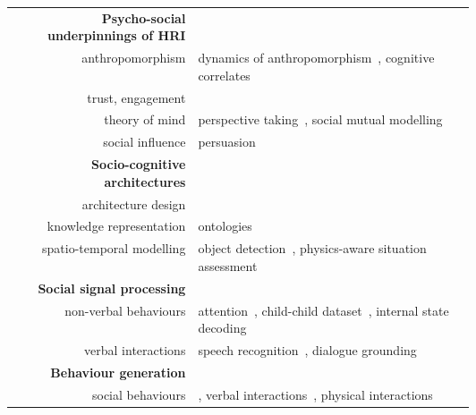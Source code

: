 \begin{table}[h]
    \centering
    \begin{tabular}{rp{0.6\linewidth}}
        \toprule
        \textbf{Psycho-social underpinnings of HRI} \\  
        anthropomorphism & \small dynamics of
        anthropomorphism~\cite{lemaignan2014dynamics}, cognitive correlates~\cite{lemaignan2014cognitive} \\
        trust, engagement & \small \cite{flook2019impact,lemaignan2015youre,fink2014which} \\
        theory of mind & \small perspective taking~\cite{ros2010which, warnier2012when}, social mutual modelling~\cite{lemaignan2015mutual,dillenbourg2016symmetry} \\
        social influence & \small persuasion~\cite{winkle2019effective} \\
        \midrule
        \textbf{Socio-cognitive architectures} \\
        architecture design & \small \cite{lemaignan2017artificial, baxter2016cognitive,lemaignan2014challenges,lallee2012towards, mallet2010genom3} \\
        knowledge representation & \small
        ontologies~\cite{lemaignan2010oro, lemaignan2013explicit} \\    
        spatio-temporal modelling & \small object
        detection~\cite{wallbridge2017qualitative}, \newline physics-aware situation
        assessment~\cite{lemaignan2018underworlds,sallami2019simulation} \\
        \midrule
        \textbf{Social signal processing}\\
        non-verbal behaviours & \small attention~\cite{lemaignan2016realtime},
        child-child dataset~\cite{lemaignan2018pinsoro}, internal state decoding~\cite{bartlett2019what} \\
        verbal interactions & \small speech recognition~\cite{kennedy2017child}, dialogue grounding~\cite{lemaignan2011grounding} \\
        \midrule
        \textbf{Behaviour generation} \\
        social behaviours & \small \cite{lallee2011towards}, verbal interactions~\cite{wallbridge2019generating, wallbridge2019towards}, physical interactions~\cite{gharbi2013natural} \\

\end{tabular}
\end{table}

